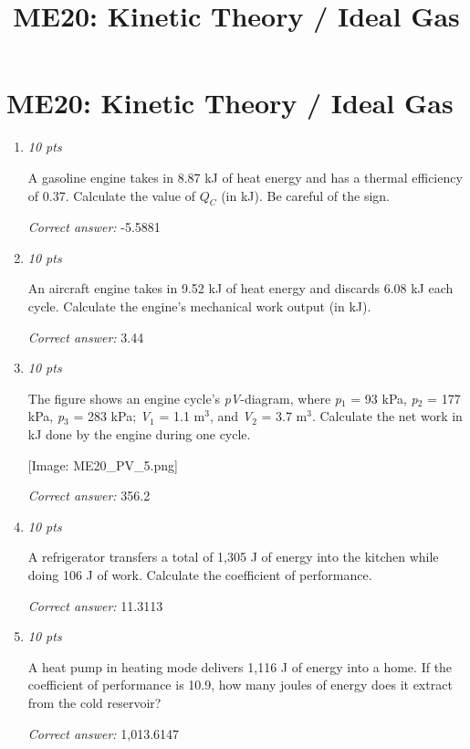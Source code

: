 \documentclass[11pt]{article}
\title{ME20: Kinetic Theory / Ideal Gas}
\author{}
\date{}
\begin{document}
\maketitle

\section*{ME20: Kinetic Theory / Ideal Gas}

\begin{enumerate}[leftmargin=*,label=\textbf{Question \arabic*.}]

\item \hfill \textit{10 pts}

A gasoline engine takes in 8.87 kJ of heat energy and has a thermal efficiency of 0.37. Calculate the value of  $Q_C$  (in kJ). Be careful of the sign.

\textit{Correct answer:} -5.5881

\item \hfill \textit{10 pts}

An aircraft engine takes in 9.52 kJ of heat energy and discards 6.08 kJ each cycle. Calculate the engine's mechanical work output (in kJ).

\textit{Correct answer:} 3.44

\item \hfill \textit{10 pts}

The figure shows an engine cycle's \emph{pV}-diagram, where \emph{p}$_{1}$ = 93 kPa, \emph{p}$_{2}$ = 177 kPa, \emph{p}$_{3}$ = 283 kPa; \emph{V}$_{1}$ = 1.1 m$^{3}$, and \emph{V}$_{2}$ = 3.7 m$^{3}$. Calculate the net work in kJ done by the engine during one cycle.

 [Image: ME20\_PV\_5.png]

\textit{Correct answer:} 356.2

\item \hfill \textit{10 pts}

A refrigerator transfers a total of 1,305 J of energy into the kitchen while doing 106 J of work. Calculate the coefficient of performance.

\textit{Correct answer:} 11.3113

\item \hfill \textit{10 pts}

A heat pump in heating mode delivers 1,116 J of energy into a home. If the coefficient of performance is 10.9, how many joules of energy does it extract from the cold reservoir?

\textit{Correct answer:} 1,013.6147


\end{enumerate}
\end{document}
